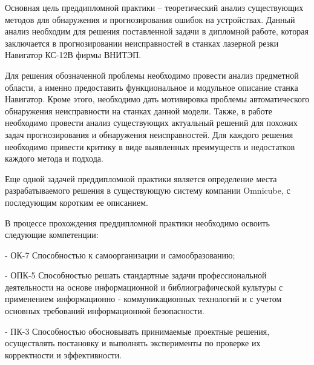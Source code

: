 
Основная цель преддипломной практики --
теоретический анализ существующих методов
для обнаружения и прогнозирования ошибок на устройствах.
Данный анализ необходим для решения поставленной
задачи в дипломной работе, которая заключается
в прогнозировании неисправностей в станках лазерной резки
Навигатор КС-12В фирмы ВНИТЭП.

Для решения обозначенной проблемы
необходимо провести анализ предметной области,
а именно предоставить
функциональное и модульное описание станка Навигатор.
Кроме этого, необходимо дать мотивировка проблемы
автоматического обнаружения неисправности на станках данной модели.
Также, в работе необходимо провести анализ существующих
актуальный решений для похожих задач прогнозирования и обнаружения неисправностей.
Для каждого решения необходимо привести критику в виде выявленных преимуществ и недостатков
каждого метода и подхода.

Еще одной задачей преддипломной практики является
определение места разрабатываемого решения в существующую
систему компании Omnicube, с последующим коротким ее описанием.

В процессе прохождения преддипломной практики необходимо освоить следующие компетенции:

- ОК-7 Способностью к самоорганизации и самообразованию;

- ОПК-5 Способностью решать стандартные задачи профессиональной деятельности на основе информационной и библиографической культуры с применением информационно - коммуникационных технологий и с учетом основных требований информационной безопасности.

- ПК-3 Способностью обосновывать принимаемые проектные решения, осуществлять постановку и выполнять эксперименты по проверке их корректности и эффективности.

\clearpage